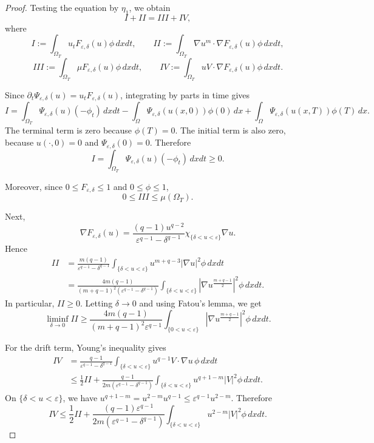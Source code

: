 \documentclass{amsart}
\numberwithin{equation}{section}
\begin{document}
\begin{proof}
Testing the equation by $\eta_1$, we obtain
\[
I+II=III+IV,
\]
where
\[
I:=
\int_{\Omega_T}
u_tF_{\varepsilon,\delta}(u)\phi\,dxdt,
\qquad
II:=
\int_{\Omega_T}
\nabla u^m\cdot\nabla F_{\varepsilon,\delta}(u)\phi\,dxdt,
\]
\[
III:=
\int_{\Omega_T}
\mu F_{\varepsilon,\delta}(u)\phi\,dxdt,
\qquad
IV:=
\int_{\Omega_T}
uV\cdot\nabla F_{\varepsilon,\delta}(u)\phi\,dxdt.
\]

Since $\partial_t\Psi_{\varepsilon,\delta}(u) = u_tF_{\varepsilon,\delta}(u)$, 
integrating by parts in time gives
\[
I
=
\int_{\Omega_T}
\Psi_{\varepsilon,\delta}(u)(-\phi_t)\,dxdt 
-\int_\Omega
\Psi_{\varepsilon,\delta}(u(x,0))\phi(0)\,dx
+
\int_\Omega
\Psi_{\varepsilon,\delta}(u(x,T))\phi(T)\,dx.
\]
The terminal term is zero because $\phi(T)=0$. The initial term is also zero,
because $u(\cdot,0)=0$ and 
$\Psi_{\varepsilon,\delta}(0)=0$.
Therefore
\begin{equation}\label{I01-smooth-u}
I
=
\int_{\Omega_T}
\Psi_{\varepsilon,\delta}(u)(-\phi_t)\,dxdt
\ge0.
\end{equation}

Moreover, since $0\le F_{\varepsilon,\delta}\le1$ and $0\le\phi\le1$,
\begin{equation}\label{III01-smooth-u}
0\le III\le \mu(\Omega_T).
\end{equation}

Next,
\[
\nabla F_{\varepsilon,\delta}(u)
=
\frac{(q-1)u^{q-2}}
{\varepsilon^{q-1}-\delta^{q-1}}
\chi_{\{\delta<u<\varepsilon\}}
\nabla u.
\]
Hence
\[
\begin{aligned}
II
&=
\frac{m(q-1)}
{\varepsilon^{q-1}-\delta^{q-1}}
\int_{\{\delta<u<\varepsilon\}}
u^{m+q-3}
|\nabla u|^2\phi\,dxdt  \\
&=
\frac{4m(q-1)}
{(m+q-1)^2(\varepsilon^{q-1}-\delta^{q-1})}
\int_{\{\delta<u<\varepsilon\}}
\left|\nabla u^{\frac{m+q-1}{2}}\right|^2\phi\,dxdt.
\end{aligned}
\]
In particular, $II\ge0$. Letting $\delta\to0$ and using Fatou's lemma, we get
\begin{equation}\label{II01-smooth-u}
\liminf_{\delta\to0}II
\ge
\frac{4m(q-1)}
{(m+q-1)^2\varepsilon^{q-1}}
\int_{\{0<u<\varepsilon\}}
\left|\nabla u^{\frac{m+q-1}{2}}\right|^2\phi\,dxdt.
\end{equation}

For the drift term, Young's inequality gives
\[
\begin{aligned}
IV
&=
\frac{q-1}{\varepsilon^{q-1}-\delta^{q-1}}
\int_{\{\delta<u<\varepsilon\}}
u^{q-1}V\cdot\nabla u\,\phi\,dxdt  \\
&\le
\frac12 II
+
\frac{q-1}{2m(\varepsilon^{q-1}-\delta^{q-1})}
\int_{\{\delta<u<\varepsilon\}}
u^{q+1-m}|V|^2\phi\,dxdt.
\end{aligned}
\]
On $\{\delta<u<\varepsilon\}$, we have
$
u^{q+1-m}
=
u^{2-m}u^{q-1}
\le
\varepsilon^{q-1}u^{2-m}$.
Therefore
\begin{equation}\label{IV01-smooth-u}
IV
\le
\frac12 II
+
\frac{(q-1)\varepsilon^{q-1}}
{2m(\varepsilon^{q-1}-\delta^{q-1})}
\int_{\{\delta<u<\varepsilon\}}
u^{2-m}|V|^2\phi\,dxdt.
\end{equation}


\end{proof}
\end{document}
